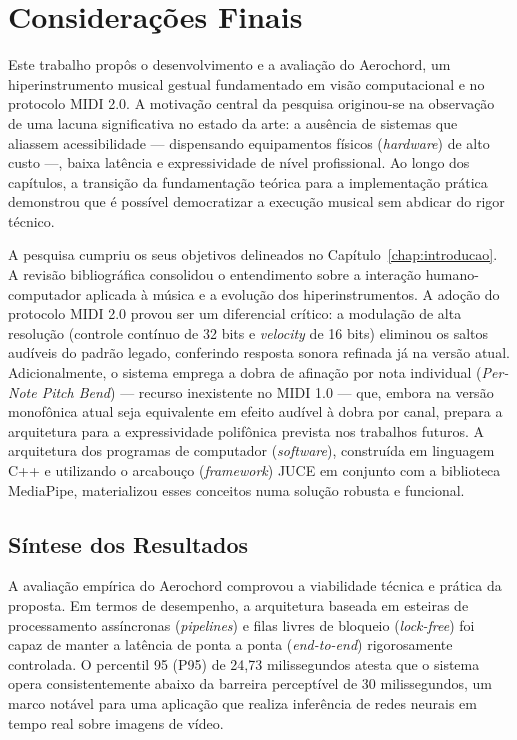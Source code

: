 \chapter{Considerações Finais}
\label{chap:consideracoes_finais}

Este trabalho propôs o desenvolvimento e a avaliação do Aerochord, um hiperinstrumento musical gestual fundamentado em visão computacional e no protocolo MIDI 2.0. A motivação central da pesquisa originou-se na observação de uma lacuna significativa no estado da arte: a ausência de sistemas que aliassem acessibilidade — dispensando equipamentos físicos (\textit{hardware}) de alto custo —, baixa latência e expressividade de nível profissional. Ao longo dos capítulos, a transição da fundamentação teórica para a implementação prática demonstrou que é possível democratizar a execução musical sem abdicar do rigor técnico.

A pesquisa cumpriu os seus objetivos delineados no Capítulo~\ref{chap:introducao}. A revisão bibliográfica consolidou o entendimento sobre a interação humano-computador aplicada à música e a evolução dos hiperinstrumentos. A adoção do protocolo MIDI 2.0 provou ser um diferencial crítico: a modulação de alta resolução (controle contínuo de 32 bits e \textit{velocity} de 16 bits) eliminou os saltos audíveis do padrão legado, conferindo resposta sonora refinada já na versão atual. Adicionalmente, o sistema emprega a dobra de afinação por nota individual (\textit{Per-Note Pitch Bend}) — recurso inexistente no MIDI 1.0 — que, embora na versão monofônica atual seja equivalente em efeito audível à dobra por canal, prepara a arquitetura para a expressividade polifônica prevista nos trabalhos futuros. A arquitetura dos programas de computador (\textit{software}), construída em linguagem C++ e utilizando o arcabouço (\textit{framework}) JUCE em conjunto com a biblioteca MediaPipe, materializou esses conceitos numa solução robusta e funcional.

\section{Síntese dos Resultados}
\label{sec:sintese_resultados}

A avaliação empírica do Aerochord comprovou a viabilidade técnica e prática da proposta. Em termos de desempenho, a arquitetura baseada em esteiras de processamento assíncronas (\textit{pipelines}) e filas livres de bloqueio (\textit{lock-free}) foi capaz de manter a latência de ponta a ponta (\textit{end-to-end}) rigorosamente controlada. O percentil 95 (P95) de 24,73 milissegundos atesta que o sistema opera consistentemente abaixo da barreira perceptível de 30 milissegundos, um marco notável para uma aplicação que realiza inferência de redes neurais em tempo real sobre imagens de vídeo. 

